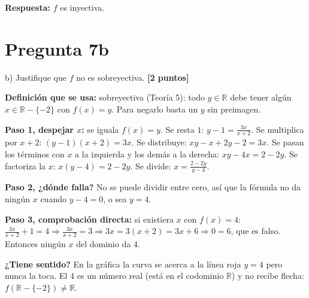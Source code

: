 \documentclass[11pt]{article}
\newcommand{\hl}[1]{\colorbox{green!35}{#1}}
\begin{document}
\textbf{Respuesta:} $f$ es inyectiva.

\clearpage
\section*{Pregunta 7b}

b) Justifique que $f$ \hl{no es sobreyectiva}. \hfill\textbf{[2 puntos]}

\begin{center}
\end{center}


\begin{explica}
\textbf{Definición que se usa:} sobreyectiva (Teoría 5): todo $y\in\mathbb R$ debe tener algún $x\in\mathbb R-\{-2\}$ con $f(x)=y$. Para negarlo basta un $y$ sin preimagen.

\textbf{Paso 1, despejar $x$:} se iguala $f(x)=y$. Se resta $1$: $y-1=\frac{3x}{x+2}$. Se multiplica por $x+2$: $(y-1)(x+2)=3x$. Se distribuye: $xy-x+2y-2=3x$. Se pasan los términos con $x$ a la izquierda y los demás a la derecha: $xy-4x=2-2y$. Se factoriza la $x$: $x(y-4)=2-2y$. Se divide: $x=\frac{2-2y}{y-4}$.

\textbf{Paso 2, ¿dónde falla?} No se puede dividir entre cero, así que la fórmula no da ningún $x$ cuando $y-4=0$, o sea $y=4$.

\textbf{Paso 3, comprobación directa:} si existiera $x$ con $f(x)=4$: $\frac{3x}{x+2}+1=4\Rightarrow\frac{3x}{x+2}=3\Rightarrow 3x=3(x+2)=3x+6\Rightarrow 0=6$, que es falso. Entonces ningún $x$ del dominio da $4$.

\textbf{¿Tiene sentido?} En la gráfica la curva se acerca a la línea roja $y=4$ pero nunca la toca. El $4$ es un número real (está en el codominio $\mathbb R$) y no recibe flecha: $f(\mathbb R-\{-2\})\neq\mathbb R$.
\end{explica}
\end{document}
